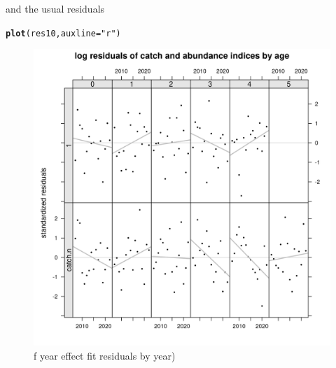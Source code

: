 \documentclass[a4paper,english,11pt]{article}\usepackage[]{graphicx}\usepackage[]{xcolor}
\makeatletter
\newcommand{\hlsng}[1]{\textcolor[rgb]{0.192,0.494,0.8}{#1}}%
\newcommand{\hldef}[1]{\textcolor[rgb]{0.345,0.345,0.345}{#1}}%
\newcommand{\hlkwc}[1]{\textcolor[rgb]{0.333,0.667,0.333}{#1}}%
\newcommand{\hlkwd}[1]{\textcolor[rgb]{0.737,0.353,0.396}{\textbf{#1}}}%
\newenvironment{kframe}{%
 \def\at@end@of@kframe{}%
 \ifinner\ifhmode%
  \def\at@end@of@kframe{\end{minipage}}%
  \begin{minipage}{\columnwidth}%
 \fi\fi%
 \def\FrameCommand##1{\hskip\@totalleftmargin \hskip-\fboxsep
 \colorbox{shadecolor}{##1}\hskip-\fboxsep
     \hskip-\linewidth \hskip-\@totalleftmargin \hskip\columnwidth}%
 \MakeFramed {\advance\hsize-\width
   \@totalleftmargin\z@ \linewidth\hsize
   \@setminipage}}%
 {\par\unskip\endMakeFramed%
 \at@end@of@kframe}
\newenvironment{knitrout}{}{} %
\makeatother
\begin{document}
and the usual residuals

\begin{knitrout}
\color{fgcolor}\begin{kframe}
\begin{alltt}
\hlkwd{plot}\hldef{(res10,} \hlkwc{auxline} \hldef{=} \hlsng{"r"}\hldef{)}
\end{alltt}
\end{kframe}\begin{figure}[H]

{\centering \includegraphics[width=.9\linewidth]{figure/vageresbyyear-1} 

}

\caption[f year effect fit residuals by year)]{f year effect fit residuals by year)}\label{fig:vageresbyyear}
\end{figure}

\end{knitrout}
\end{document}
